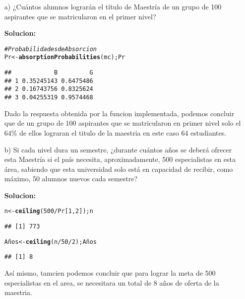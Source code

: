 \documentclass[11pt]{article}\usepackage[]{graphicx}\usepackage[table]{xcolor}
\makeatletter
\newcommand{\hlnum}[1]{\textcolor[rgb]{0.686,0.059,0.569}{#1}}%
\newcommand{\hlcom}[1]{\textcolor[rgb]{0.678,0.584,0.686}{\textit{#1}}}%
\newcommand{\hlopt}[1]{\textcolor[rgb]{0,0,0}{#1}}%
\newcommand{\hlstd}[1]{\textcolor[rgb]{0.345,0.345,0.345}{#1}}%
\newcommand{\hlkwb}[1]{\textcolor[rgb]{0.69,0.353,0.396}{#1}}%
\newcommand{\hlkwd}[1]{\textcolor[rgb]{0.737,0.353,0.396}{\textbf{#1}}}%
\newenvironment{kframe}{%
 \def\at@end@of@kframe{}%
 \ifinner\ifhmode%
  \def\at@end@of@kframe{\end{minipage}}%
  \begin{minipage}{\columnwidth}%
 \fi\fi%
 \def\FrameCommand##1{\hskip\@totalleftmargin \hskip-\fboxsep
 \colorbox{shadecolor}{##1}\hskip-\fboxsep
     \hskip-\linewidth \hskip-\@totalleftmargin \hskip\columnwidth}%
 \MakeFramed {\advance\hsize-\width
   \@totalleftmargin\z@ \linewidth\hsize
   \@setminipage}}%
 {\par\unskip\endMakeFramed%
 \at@end@of@kframe}
\newenvironment{knitrout}{}{} %
\makeatother
\begin{document}
\begin{enumerate}
    \item[a)] ¿Cuántos alumnos lograrán el título de Maestría de un grupo de 100 aspirantes que se matricularon en el primer nivel?
    
    \textbf{Solucion:}
    
\begin{knitrout}
\color{fgcolor}\begin{kframe}
\begin{alltt}
\hlcom{#Probabilidades de Absorcion}
\hlstd{Pr} \hlkwb{<-} \hlkwd{absorptionProbabilities}\hlstd{(mc);Pr}
\end{alltt}
\begin{verbatim}
##            B         G
## 1 0.35245143 0.6475486
## 2 0.16743756 0.8325624
## 3 0.04255319 0.9574468
\end{verbatim}
\end{kframe}
\end{knitrout}
    
    Dado la respuesta obtenida por la funcion implementada, podemos concluir que de un grupo de 100 aspirantes que se matricularon en primer nivel solo el $64\%$ de ellos lograran el titulo de la maestria en este caso 64 estudiantes.
    
    
    \item[b)] Si cada nivel dura un semestre, ¿durante cuántos años se deberá ofrecer esta Maestría si el país necesita, aproximadamente, 500 especialistas en esta área, sabiendo que esta universidad solo está en capacidad de recibir, como máximo, 50 alumnos nuevos cada semestre?
    
    \textbf{Solucion:}
    
\begin{knitrout}
\color{fgcolor}\begin{kframe}
\begin{alltt}
\hlstd{n} \hlkwb{<-} \hlkwd{ceiling}\hlstd{(}\hlnum{500}\hlopt{/}\hlstd{Pr[}\hlnum{1}\hlstd{,}\hlnum{2}\hlstd{]);n}
\end{alltt}
\begin{verbatim}
## [1] 773
\end{verbatim}
\begin{alltt}
\hlstd{Años} \hlkwb{<-} \hlkwd{ceiling}\hlstd{(n}\hlopt{/}\hlnum{50}\hlopt{/}\hlnum{2}\hlstd{);Años}
\end{alltt}
\begin{verbatim}
## [1] 8
\end{verbatim}
\end{kframe}
\end{knitrout}
    
    Así mismo, tamcien podemos concluir que para lograr la meta de 500 especialistas en el area, se necesitara un total de 8 años de oferta de la maestria.

\end{enumerate}
\end{document}
